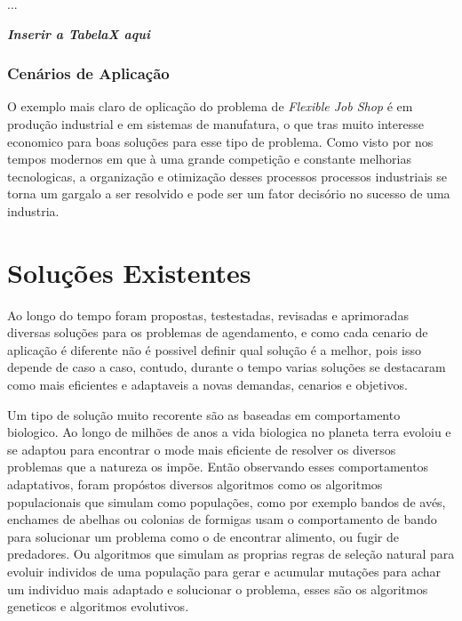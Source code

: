             ...\newline

            \textit{\textbf{Inserir a TabelaX aqui}}\newline


        \subsubsection{Cenários de Aplicação}
            O exemplo mais claro de oplicação do problema de \textit{Flexible Job Shop} é em produção industrial e em sistemas de manufatura, o que tras muito interesse economico para boas soluções para esse tipo de problema.\newline
            Como visto por \cite{Wari2016} nos tempos modernos em que à uma grande competição e constante melhorias tecnologicas, a organização e otimização desses processos processos industriais se torna um gargalo a ser resolvido e pode ser um fator decisório no sucesso de uma industria.
        
    


\section{Soluções Existentes}
        Ao longo do tempo foram propostas, testestadas, revisadas e aprimoradas diversas soluções para os problemas de agendamento, e como cada cenario de aplicação é diferente não é possivel definir qual solução é a melhor, pois isso depende de caso a caso, contudo, durante o tempo varias soluções se destacaram como mais eficientes e adaptaveis a novas demandas, cenarios e objetivos. \newline
        
        Um tipo de solução muito recorente são as baseadas em comportamento biologico. Ao longo de milhões de anos a vida biologica no planeta terra evoloiu e se adaptou para encontrar o mode mais eficiente de resolver os diversos problemas que a natureza os impõe. Então observando esses comportamentos adaptativos, foram propóstos diversos algoritmos como os algoritmos populacionais que simulam como populações, como por exemplo bandos de avés, enchames de abelhas ou colonias de formigas usam o comportamento de bando para solucionar um problema como o de encontrar alimento, ou fugir de predadores. Ou algoritmos que simulam as proprias regras de seleção natural para evoluir individos de uma população para gerar e acumular mutações para achar um individuo mais adaptado e solucionar o problema, esses são os algoritmos geneticos e algoritmos evolutivos.


